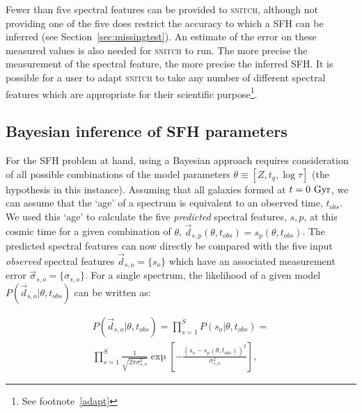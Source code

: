 \documentclass[useAMS,usenatbib]{mn2e}
\begin{document}
Fewer than five spectral features can be provided to \textsc{snitch}, although not providing one of the five does restrict the accuracy to which a SFH can be inferred (see Section~\ref{sec:missingtest}). An estimate of the error on these measured values is also needed for \textsc{snitch} to run. The more precise the measurement of the spectral feature, the more precise the inferred SFH. It is possible for a user to adapt \textsc{snitch} to take any number of different spectral features which are appropriate for their scientific purpose\footnote{See footnote~\ref{adapt}}.


\subsection{Bayesian inference of SFH parameters}\label{sec:emcee}

For the SFH problem at hand, using a Bayesian approach requires consideration of all possible combinations of the model parameters $\theta \equiv [Z, t_{q}, \log \tau]$ (the hypothesis in this instance). Assuming that all galaxies formed at $t=0~\rm{Gyr}$, we can assume that the `age' of a spectrum is equivalent to an observed time, $t_{obs}$. We used this  `age' to calculate the five \emph{predicted} spectral features, $s,p$, at this cosmic time for a given combination of $\theta$, $\vec{d}_{s,p}(\theta, t_{obs}) = {s_p(\theta, t_{obs})}$. The predicted spectral features can now directly be compared with the five input \emph{observed} spectral features $\vec{d}_{s, o} = \{s_o\}$ which have an associated measurement error $\vec{\sigma}_{s, o} = \{\sigma_{s, o}\}$. For a single spectrum, the likelihood of a given model $P(\vec{d}_{s, o}|\theta, t_{obs})$ can be written as:



\begin{multline}\label{like}
P(\vec{d}_{s, o}|\theta, t_{obs}) = \prod_{s=1}^{S} P(s_{o}|\theta, t_{obs}) = \\ \prod_{s=1}^{S} \frac{1}{\sqrt{2\pi\sigma_{s,o}^2}} \exp{\left[ - \frac{(s_{o} - s_{p}(\theta, t_{obs}))^2}{\sigma_{s, o}^2} \right]},
\end{multline}
\end{document}
